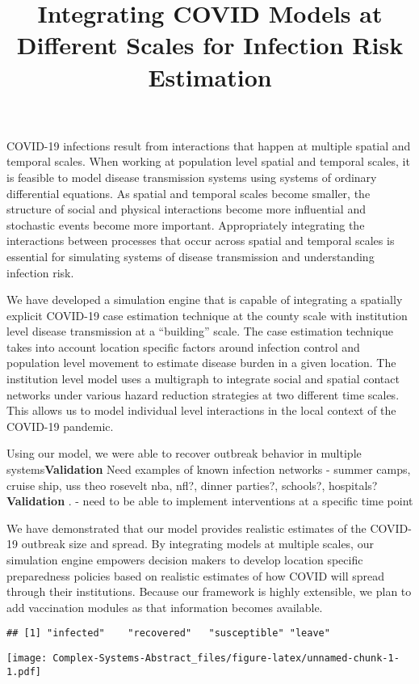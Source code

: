 \documentclass[
]{article}
\title{Integrating COVID Models at Different Scales for Infection Risk
Estimation}
\author{}
\date{\vspace{-2.5em}}
\begin{document}
\maketitle

COVID-19 infections result from interactions that happen at multiple
spatial and temporal scales. When working at population level spatial
and temporal scales, it is feasible to model disease transmission
systems using systems of ordinary differential equations. As spatial and
temporal scales become smaller, the structure of social and physical
interactions become more influential and stochastic events become more
important. Appropriately integrating the interactions between processes
that occur across spatial and temporal scales is essential for
simulating systems of disease transmission and understanding infection
risk.

We have developed a simulation engine that is capable of integrating a
spatially explicit COVID-19 case estimation technique at the county
scale with institution level disease transmission at a ``building''
scale. The case estimation technique takes into account location
specific factors around infection control and population level movement
to estimate disease burden in a given location. The institution level
model uses a multigraph to integrate social and spatial contact networks
under various hazard reduction strategies at two different time scales.
This allows us to model individual level interactions in the local
context of the COVID-19 pandemic.

Using our model, we were able to recover outbreak behavior in multiple
systems\textbf{Validation} Need examples of known infection networks -
summer camps, cruise ship, uss theo rosevelt nba, nfl?, dinner parties?,
schools?, hospitals? \textbf{Validation} . - need to be able to
implement interventions at a specific time point

We have demonstrated that our model provides realistic estimates of the
COVID-19 outbreak size and spread. By integrating models at multiple
scales, our simulation engine empowers decision makers to develop
location specific preparedness policies based on realistic estimates of
how COVID will spread through their institutions. Because our framework
is highly extensible, we plan to add vaccination modules as that
information becomes available.

\begin{verbatim}
## [1] "infected"    "recovered"   "susceptible" "leave"
\end{verbatim}

\texttt{[image: Complex-Systems-Abstract\_files/figure-latex/unnamed-chunk-1-1.pdf]}
\end{document}
